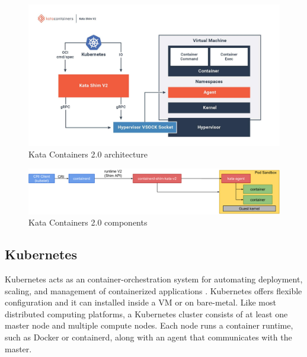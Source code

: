 \begin{figure}[ht]
  \begin{center}
    \includegraphics[width=13.5cm]{LaTeX/images/KataContainersArchitecture.jpg}
    \caption{Kata Containers 2.0 architecture \cite{KataContainers}}
    \label{fig:KataContainersArchitecture}
  \end{center}
\end{figure}

\begin{figure}[ht]
  \begin{center}
    \includegraphics[width=13.5cm]{LaTeX/images/KataContainersComponents.png}
    \caption{Kata Containers 2.0 components \cite{KataContainersArchitecture}}
    \label{fig:KataContainersComponents}
  \end{center}
\end{figure}

\subsection{Kubernetes}

Kubernetes acts as an container-orchestration system for automating deployment, scaling, and management of containerized applications \cite{Kubernetes}. Kubernetes offers flexible configuration and it can installed inside a VM or on bare-metal. Like most distributed computing platforms, a Kubernetes cluster consists of at least one master node and multiple compute nodes. Each node runs a container runtime, such as Docker or containerd, along with an agent that communicates with the master.

